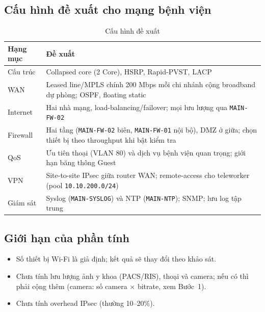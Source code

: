 \subsection{Cấu hình đề xuất cho mạng bệnh viện}
\begin{small}
\setlength{\tabcolsep}{4pt}
\begin{longtable}{|p{2.2cm}|p{11.6cm}|}
\caption{Cấu hình đề xuất} \label{tab:proposed_config} \\
\hline
\textbf{Hạng mục} & \textbf{Đề xuất} \\ \hline
\endhead
Cấu trúc & Collapsed core (2 Core), HSRP, Rapid-PVST, LACP \\ \hline
WAN & Leased line/MPLS chính 200 Mbps mỗi chi nhánh cộng broadband dự phòng; OSPF, floating static \\ \hline
Internet & Hai nhà mạng, load-balancing/failover; mọi lưu lượng qua \texttt{MAIN-FW-02} \\ \hline
Firewall & Hai tầng (\texttt{MAIN-FW-02} biên, \texttt{MAIN-FW-01} nội bộ), DMZ ở giữa; chọn thiết bị theo throughput khi bật kiểm tra \\ \hline
QoS & Ưu tiên thoại (VLAN 80) và dịch vụ bệnh viện quan trọng; giới hạn băng thông Guest \\ \hline
VPN & Site-to-site IPsec giữa router WAN; remote-access cho teleworker (pool \texttt{10.10.200.0/24}) \\ \hline
Giám sát & Syslog (\texttt{MAIN-SYSLOG}) và NTP (\texttt{MAIN-NTP}); SNMP; lưu log tập trung \\ \hline
\end{longtable}
\end{small}

\subsection{Giới hạn của phần tính}
\begin{itemize}[noitemsep,topsep=2pt]
    \item Số thiết bị Wi-Fi là giả định; kết quả sẽ thay đổi theo khảo sát.
    \item Chưa tính lưu lượng ảnh y khoa (PACS/RIS), thoại và camera; nếu có thì phải cộng thêm (camera: số camera $\times$ bitrate, xem Bước~1).
    \item Chưa tính overhead IPsec (thường 10--20\%).
\end{itemize}
